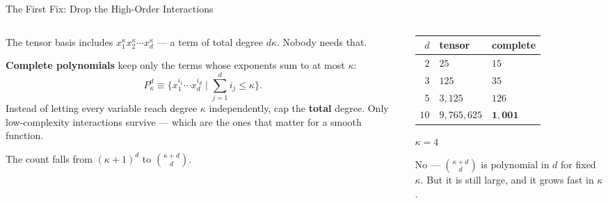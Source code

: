 \begin{frame}{The First Fix: Drop the High-Order Interactions}
\begin{columns}[T]
\begin{column}{0.52\textwidth}
\small
The tensor basis includes $x_1^{\kappa}x_2^{\kappa}\cdots x_d^{\kappa}$ --- a term of total degree $d\kappa$. Nobody needs that.
\medskip

\textbf{Complete polynomials} keep only the terms whose exponents sum to at most $\kappa$:
\[
  P^{d}_{\kappa}\equiv\Big\{x_1^{i_1}\cdots x_d^{i_d}\;\Big|\;\sum_{j=1}^{d}i_j\le \kappa\Big\}.
\]
Instead of letting every variable reach degree $\kappa$ independently, cap the \textbf{total} degree. Only low-complexity interactions survive --- which are the ones that matter for a smooth function.
\medskip

The count falls from $(\kappa+1)^{d}$ to $\binom{\kappa+d}{d}$.
\end{column}
\begin{column}{0.45\textwidth}
\begin{center}\footnotesize
\begin{tabularx}{\linewidth}{@{}r >{\raggedleft\arraybackslash}X >{\raggedleft\arraybackslash}X@{}}
\toprule
$d$ & tensor & complete \\
\midrule
$2$  & $25$ & $15$ \\
$3$  & $125$ & $35$ \\
$5$  & $3{,}125$ & $126$ \\
$10$ & $9{,}765{,}625$ & $\mathbf{1{,}001}$ \\
\bottomrule
\end{tabularx}
\end{center}
{\scriptsize\hfill $\kappa=4$}
\medskip
\begin{cautionbox}[title=\textbf{Still exponential?}]\footnotesize
No --- $\binom{\kappa+d}{d}$ is polynomial in $d$ for fixed $\kappa$. But it is still large, and it grows fast in $\kappa$.
\end{cautionbox}
\end{column}
\end{columns}
\vspace{1mm}
\end{frame}

